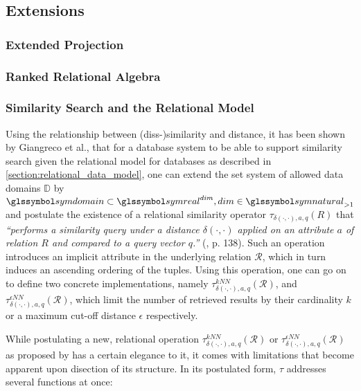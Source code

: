 \subsection{Extensions}
\label{section:rel_extensions}


\subsubsection{Extended Projection}

\subsubsection{Ranked Relational Algebra}

\subsubsection{Similarity Search and the Relational Model}

Using the relationship between (diss-)similarity and distance, it has been shown by Giangreco et al., that for a database system to be able to support similarity search given the relational model for databases as described in \cref{section:relational_data_model}, one can extend the set system of allowed data domains $\mathbb{D}$ by $\symdomain \subset \symreal^{dim}, dim \in \symnatural_{>1}$ and postulate the existence of a relational similarity operator $\tau_{\delta(\cdot,\cdot),a,q}(R)$ that \emph{``performs a similarity query under a distance $\delta(\cdot,\cdot)$ applied on an attribute $a$ of relation $R$ and compared to a query vector $q$.''} (\cite{Giangreco:2018thesis}, p. 138). Such an operation introduces an implicit attribute in the underlying relation $\mathcal{R}$, which in turn induces an ascending ordering of the tuples. Using this operation, one can go on to define two concrete implementations, namely $\tau^{kNN}_{\delta(\cdot,\cdot),a,q}(\mathcal{R})$, and $\tau^{\epsilon NN}_{\delta(\cdot,\cdot),a,q}(\mathcal{R})$, which limit the number of retrieved results by their cardinality $k$ or a maximum cut-off distance $\epsilon$ respectively.

While postulating a new, relational operation $\tau^{kNN}_{\delta(\cdot,\cdot),a,q}(\mathcal{R})$ or $\tau^{\epsilon NN}_{\delta(\cdot,\cdot),a,q}(\mathcal{R})$ as proposed by \cite{Giangreco:2018thesis} has a certain elegance to it, it comes with limitations that become apparent upon disection of its structure. In its postulated form, $\tau$ addresses several functions at once:

